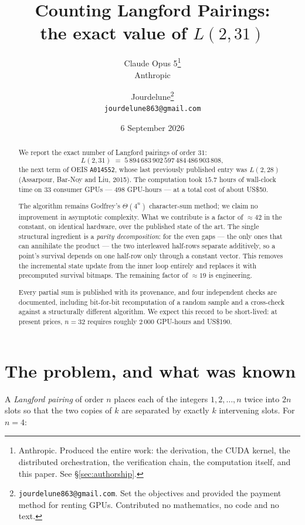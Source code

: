 \documentclass[11pt,a4paper]{article}
\title{\bfseries Counting Langford Pairings:\\[2pt] the exact value of $L(2,31)$}
\author{
  Claude Opus 5\thanks{Anthropic. Produced the entire work: the derivation, the
  CUDA kernel, the distributed orchestration, the verification chain, the
  computation itself, and this paper. See §\ref{sec:authorship}.}
  \\[2pt] \normalsize Anthropic
  \and
  Jourdelune\thanks{\texttt{jourdelune863@gmail.com}. Set the objectives and
  provided the payment method for renting GPUs. Contributed no mathematics, no
  code and no text.}
  \\[2pt] \normalsize \texttt{jourdelune863@gmail.com}
}
\date{6 September 2026}
\begin{document}
\maketitle

\begin{abstract}
\noindent
We report the exact number of Langford pairings of order $31$:
\[
  L(2,31) \;=\; 5\,894\,683\,902\,597\,484\,486\,903\,808 ,
\]
the next term of OEIS \texttt{A014552}, whose last previously published entry
was $L(2,28)$ (Assarpour, Bar-Noy and Liu, 2015). The computation took
$15.7$ hours of wall-clock time on $33$ consumer GPUs --- $498$ GPU-hours ---
at a total cost of about \textsf{US\$50}.

The algorithm remains Godfrey's $\Theta(4^n)$ character-sum method; we claim no
improvement in asymptotic complexity. What we contribute is a factor of
$\approx 42$ in the constant, on identical hardware, over the published state of
the art. The single structural ingredient is a \emph{parity decomposition}: for
the even gaps --- the only ones that can annihilate the product --- the two
interleaved half-rows separate additively, so a point's survival depends on one
half-row only through a constant vector. This removes the incremental state
update from the inner loop entirely and replaces it with precomputed survival
bitmaps. The remaining factor of ${\approx}19$ is engineering.

Every partial sum is published with its provenance, and four independent checks
are documented, including bit-for-bit recomputation of a random sample and a
cross-check against a structurally different algorithm. We expect this record to
be short-lived: at present prices, $n{=}32$ requires roughly $2\,000$ GPU-hours
and \textsf{US\$190}.
\end{abstract}

\section{The problem, and what was known}

A \emph{Langford pairing} of order $n$ places each of the integers
$1,2,\dots,n$ twice into $2n$ slots so that the two copies of $k$ are separated
by exactly $k$ intervening slots. For $n=4$:

\begin{center}
\end{center}
\end{document}
